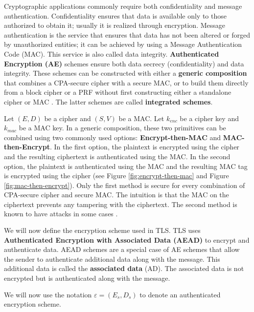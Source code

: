 Cryptographic applications commonly require both confidentiality and message authentication. Confidentiality ensures that data is available only to those authorized to obtain it; usually it is realized through encryption.  Message authentication is the service that ensures that data has not been altered or forged by unauthorized entities; it can be achieved by using a Message Authentication Code (MAC). This service is also called data integrity. \textbf{Authenticated Encryption (AE)} \cite{ae} schemes ensure both data secrecy (confidentiality) and data integrity. These schemes can be constructed with either a \textbf{generic composition} that combines a CPA-secure cipher with a secure MAC, or to build them directly from a block cipher or a PRF without first constructing either a standalone cipher or MAC \cite{gradcourse}. The latter schemes are called \textbf{integrated schemes}. 

Let $(E, D)$ be a cipher and $(S, V)$ be a MAC. Let $k_{enc}$ be a cipher key and $k_{mac}$ be a MAC key. In a generic composition, these two primitives can be combined using two commonly used options: \textbf{Encrypt-then-MAC} and \textbf{MAC-then-Encrypt}. In the first option, the plaintext is encrypted using the cipher and the resulting ciphertext is authenticated using the MAC. In the second option, the plaintext is authenticated using the MAC and the resulting MAC tag is encrypted using the cipher (see Figure \ref{fig:encrypt-then-mac} and Figure \ref{fig:mac-then-encrypt}). Only the first method is secure for every combination of CPA-secure cipher and secure MAC. The intuition is that the MAC on the ciphertext prevents any tampering with the ciphertext. The second method is known to have attacks in some cases \cite{gradcourse}. 

We will now define the encryption scheme used in TLS. TLS uses \textbf{Authenticated Encryption with Associated Data (AEAD)} \cite{aead} to encrypt and authenticate data. AEAD schemes are a special case of AE schemes that allow the sender to authenticate additional data along with the message. This additional data is called the \textbf{associated data} (AD). The associated data is not encrypted but is authenticated along with the message.

We will now use the notation $\varepsilon = (E_s , D_s)$ to denote an authenticated encryption scheme.  

